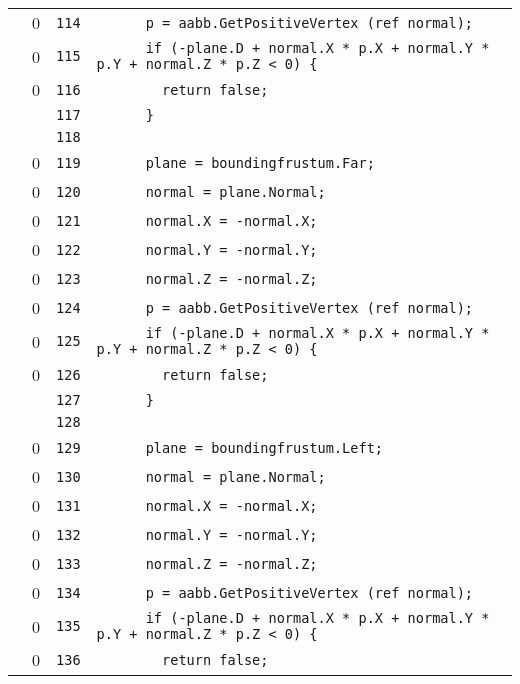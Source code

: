 \documentclass[a4paper,10pt]{article}
\begin{document}
\begin{longtable}[l]{lrrl}
\cellcolor{red} & 0 & \verb~114~ & \verb~      p = aabb.GetPositiveVertex (ref normal);~\\
\cellcolor{red} & 0 & \verb~115~ & \verb~      if (-plane.D + normal.X * p.X + normal.Y * p.Y + normal.Z * p.Z < 0) {~\\
\cellcolor{red} & 0 & \verb~116~ & \verb~        return false;~\\
\cellcolor{gray} &  & \verb~117~ & \verb~      }~\\
\cellcolor{gray} &  & \verb~118~ & \verb~~\\
\cellcolor{red} & 0 & \verb~119~ & \verb~      plane = boundingfrustum.Far;~\\
\cellcolor{red} & 0 & \verb~120~ & \verb~      normal = plane.Normal;~\\
\cellcolor{red} & 0 & \verb~121~ & \verb~      normal.X = -normal.X;~\\
\cellcolor{red} & 0 & \verb~122~ & \verb~      normal.Y = -normal.Y;~\\
\cellcolor{red} & 0 & \verb~123~ & \verb~      normal.Z = -normal.Z;~\\
\cellcolor{red} & 0 & \verb~124~ & \verb~      p = aabb.GetPositiveVertex (ref normal);~\\
\cellcolor{red} & 0 & \verb~125~ & \verb~      if (-plane.D + normal.X * p.X + normal.Y * p.Y + normal.Z * p.Z < 0) {~\\
\cellcolor{red} & 0 & \verb~126~ & \verb~        return false;~\\
\cellcolor{gray} &  & \verb~127~ & \verb~      }~\\
\cellcolor{gray} &  & \verb~128~ & \verb~~\\
\cellcolor{red} & 0 & \verb~129~ & \verb~      plane = boundingfrustum.Left;~\\
\cellcolor{red} & 0 & \verb~130~ & \verb~      normal = plane.Normal;~\\
\cellcolor{red} & 0 & \verb~131~ & \verb~      normal.X = -normal.X;~\\
\cellcolor{red} & 0 & \verb~132~ & \verb~      normal.Y = -normal.Y;~\\
\cellcolor{red} & 0 & \verb~133~ & \verb~      normal.Z = -normal.Z;~\\
\cellcolor{red} & 0 & \verb~134~ & \verb~      p = aabb.GetPositiveVertex (ref normal);~\\
\cellcolor{red} & 0 & \verb~135~ & \verb~      if (-plane.D + normal.X * p.X + normal.Y * p.Y + normal.Z * p.Z < 0) {~\\
\cellcolor{red} & 0 & \verb~136~ & \verb~        return false;~\\

\end{longtable}
\end{document}
